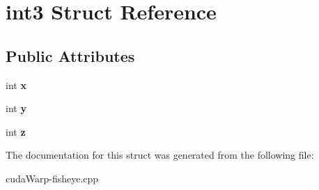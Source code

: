 \hypertarget{structint3}{}\section{int3 Struct Reference}
\label{structint3}
\subsection*{Public Attributes}
\begin{DoxyCompactItemize}
\item 
int {\bfseries x}\hypertarget{structint3_a0a4ad50a155a35fa938ce6f16930affa}{}\label{structint3_a0a4ad50a155a35fa938ce6f16930affa}

\item 
int {\bfseries y}\hypertarget{structint3_a5d95e23491677d61019f0354b16adca9}{}\label{structint3_a5d95e23491677d61019f0354b16adca9}

\item 
int {\bfseries z}\hypertarget{structint3_a5cd5a3c388fa28814e3496ef07c39360}{}\label{structint3_a5cd5a3c388fa28814e3496ef07c39360}

\end{DoxyCompactItemize}


The documentation for this struct was generated from the following file\+:\begin{DoxyCompactItemize}
\item 
cuda\+Warp-\/fisheye.\+cpp\end{DoxyCompactItemize}
